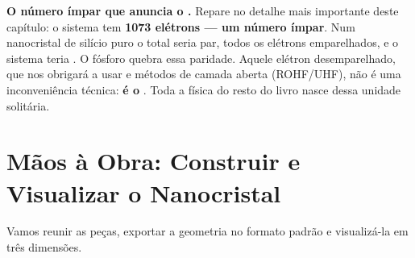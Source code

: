\begin{caixanota}
\textbf{O número ímpar que anuncia o \qubit{}.} Repare no detalhe mais importante
deste capítulo: o sistema tem \textbf{1073 elétrons --- um número ímpar}. Num
nanocristal de silício puro o total seria par, todos os elétrons emparelhados, e o
sistema teria . O fósforo quebra essa paridade. Aquele elétron
desemparelhado, que nos obrigará a usar  e métodos de camada aberta
(ROHF/UHF), não é uma inconveniência técnica: \textbf{é o \qubit{}}. Toda a física
do resto do livro nasce dessa unidade solitária.
\end{caixanota}

\section{Mãos à Obra: Construir e Visualizar o Nanocristal}
\label{sec:maos3}

Vamos reunir as peças, exportar a geometria no formato padrão  e
visualizá-la em três dimensões.

